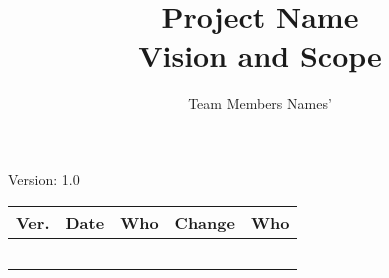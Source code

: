 \documentclass[letterpaper,12pt]{article}
\title{Project Name\\Vision and Scope}
\author{Team Members Names'}
\begin{document}
\maketitle

\begin{center}
  Version: 1.0
\end{center}

\vfill
\begin{tabularx}{\linewidth}{|l|l|l|X|l|}\hline
Ver. & Date & Who & Change & Who \\\hline
     &      &     &        &     \\\hline
     &      &     &        &     \\\hline
     &      &     &        &     \\\hline
     &      &     &        &     \\\hline
     &      &     &        &     \\\hline
\end{tabularx}
\newpage







\end{document}
